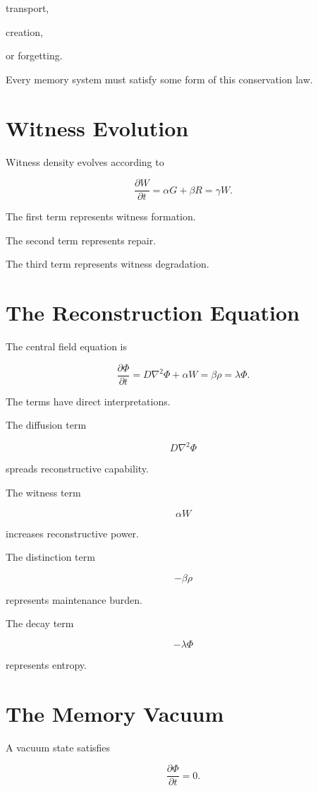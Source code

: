 \documentclass[12pt,oneside]{book}
\theoremstyle{plain} \newtheorem{theorem}{Theorem}[chapter] \newtheorem{lemma}[theorem]{Lemma} \newtheorem{proposition}[theorem]{Proposition} \newtheorem{corollary}[theorem]{Corollary}
\theoremstyle{definition} \newtheorem{definition}[theorem]{Definition} \newtheorem{axiom}[theorem]{Axiom} \newtheorem{construction}[theorem]{Construction}
\theoremstyle{remark} \newtheorem{remark}[theorem]{Remark} \newtheorem{example}[theorem]{Example}
\begin{document}
transport,

creation,

or forgetting.

Every memory system must satisfy some form of this conservation law.

\section{Witness Evolution}

Witness density evolves according to

\[
\frac{\partial W}{\partial t}
=
\alpha G
+
\beta R
=
\gamma W.
\]

The first term represents witness formation.

The second term represents repair.

The third term represents witness degradation.

\section{The Reconstruction Equation}

The central field equation is

\[
\frac{\partial \Phi}{\partial t}
=
D\nabla^2\Phi
+
\alpha W
=
\beta\rho
=
\lambda\Phi.
\]

The terms have direct interpretations.

The diffusion term

\[
D\nabla^2\Phi
\]

spreads reconstructive capability.

The witness term

\[
\alpha W
\]

increases reconstructive power.

The distinction term

\[
-\beta\rho
\]

represents maintenance burden.

The decay term

\[
-\lambda\Phi
\]

represents entropy.

\section{The Memory Vacuum}

A vacuum state satisfies

\[
\frac{\partial \Phi}{\partial t}
=
0. 

\]
\end{document}
